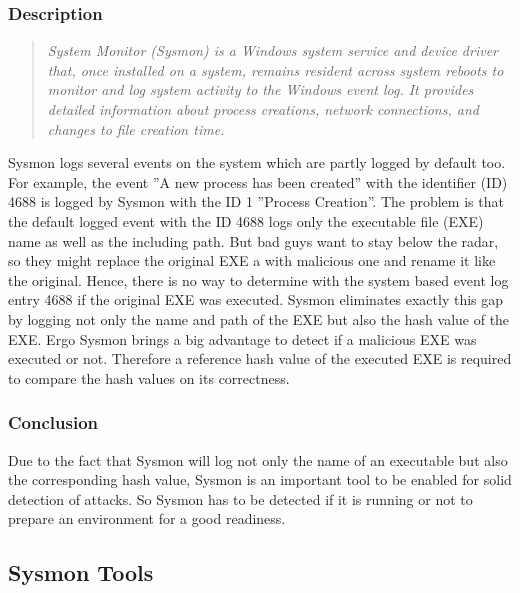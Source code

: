 \subsubsection{Description}
\begin{quotation}
    \textit{System Monitor (Sysmon) is a Windows system service and device driver that, once installed on a system, remains resident across system reboots to monitor and log system activity to the Windows event log. It provides detailed information about process creations, network connections, and changes to file creation time.\cite{Sysmon}}
\end{quotation}
Sysmon logs several events on the system which are partly logged by default too. For example, the event ''A new process has been created'' with the identifier (ID) 4688 is logged by Sysmon with the ID 1 ''Process Creation''. The problem is that the default logged event with the ID 4688 logs only the executable file (EXE) name as well as the including path. But bad guys want to stay below the radar, so they might replace the original EXE a with malicious one and rename it like the original. Hence, there is no way to determine with the system based event log entry 4688 if the original EXE was executed. Sysmon eliminates exactly this gap by logging not only the name and path of the EXE but also the hash value of the EXE. Ergo Sysmon brings a big advantage to detect if a malicious EXE was executed or not. Therefore a reference hash value of the executed EXE is required to compare the hash values on its correctness. \cite{Sysmon1}

\subsubsection{Conclusion}
Due to the fact that Sysmon will log not only the name of an executable but also the corresponding hash value, Sysmon is an important tool to be enabled for solid detection of attacks. So Sysmon has to be detected if it is running or not to prepare an environment for a good readiness.


\subsection{Sysmon Tools}

